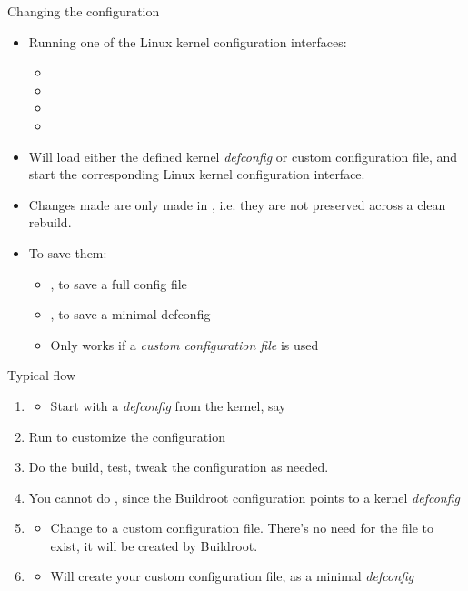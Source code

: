 \begin{frame}{Changing the configuration}
  \begin{itemize}
  \item Running one of the Linux kernel configuration interfaces:
    \begin{itemize}
    \item {}
    \item {}
    \item {}
    \item {}
    \end{itemize}
  \item Will load either the defined kernel {\em defconfig} or custom
    configuration file, and start the corresponding Linux kernel
    configuration interface.
  \item Changes made are only made in
    , i.e. they are not preserved
    across a clean rebuild.
  \item To save them:
    \begin{itemize}
    \item {}, to save a full config file
    \item {}, to save a minimal
      defconfig
    \item Only works if a {\em custom configuration file} is used
    \end{itemize}
  \end{itemize}
\end{frame}

\begin{frame}{Typical flow}
  \begin{enumerate}
  \item {}
    \begin{itemize}
    \item Start with a {\em defconfig} from the kernel, say 
    \end{itemize}
  \item Run  to customize the
    configuration
  \item Do the build, test, tweak the configuration as needed.
  \item You cannot do ,
    since the Buildroot configuration points to a kernel {\em
      defconfig}
  \item {}
    \begin{itemize}
    \item Change to a custom configuration file. There's no need for
      the file to exist, it will be created by Buildroot.
    \end{itemize}
  \item {}
    \begin{itemize}
    \item Will create your custom configuration file, as a minimal
      {\em defconfig}
    \end{itemize}
  \end{enumerate}
\end{frame}

